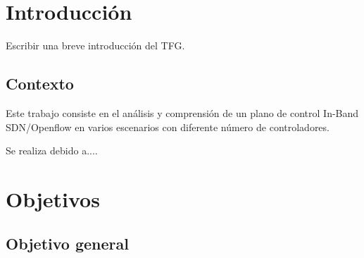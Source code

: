 \documentclass[a4paper, 12pt]{book}
\begin{document}
	\tableofcontents 
	\cleardoublepage
	\listoffigures %
	
	
	
	\clearpage
	\chapter{Introducción}
	\label{sec:intro} %
	
	
	Escribir una breve introducción del TFG.
	
	\section{Contexto}
	\label{sec:contexto}
	
	Este trabajo consiste en el análisis y comprensión de un plano de control In-Band SDN/Openflow en varios escenarios con diferente número de controladores.
	
	 Se realiza debido a....
	

	
	
	\cleardoublepage %
	\chapter{Objetivos} %
	\label{chap:objetivos} %
	
	\section{Objetivo general} %
	\label{sec:objetivo-general} %
	
\end{document}

